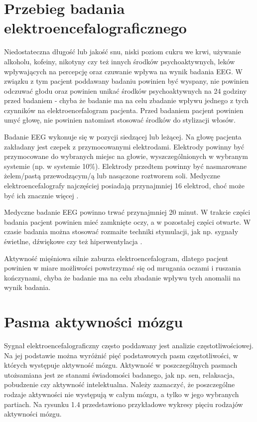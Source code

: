 \documentclass[notitlepage]{report}
\begin{document}
\section{Przebieg badania elektroencefalograficznego}
Niedostateczna długość lub jakość snu, niski poziom cukru we krwi, używanie alkoholu, kofeiny, nikotyny czy też innych środków psychoaktywnych, leków wpływających na percepcję oraz czuwanie wpływa na wynik badania EEG. W związku z tym pacjent poddawany badaniu powinien być wyspany, nie powinien odczuwać głodu oraz powinien unikać środków psychoaktywnych na 24 godziny przed badaniem - chyba że badanie ma na celu zbadanie wpływu jednego z tych czynników na elektroencefalogram pacjenta. Przed badaniem pacjent powinien umyć głowę, nie powinien natomiast stosować środków do stylizacji włosów. 

Badanie EEG wykonuje się w pozycji siedzącej lub leżącej. Na głowę pacjenta zakładany jest czepek z przymocowanymi elektrodami. Elektrody powinny być przymocowane do wybranych miejsc na głowie, wyszczególnionych w wybranym systemie (np. w systemie 10\%). Elektrody przedtem powinny być nasmarowane żelem/pastą przewodzącym/ą lub nasączone roztworem soli. Medyczne elektroencefalografy najczęściej posiadają przynajmniej 16 elektrod, choć może być ich znacznie więcej \cite{teplan} \cite{lantz}. 

Medyczne badanie EEG powinno trwać przynajmniej 20 minut. W trakcie części badania pacjent powinien mieć zamknięte oczy, a w pozostałej części otwarte. W czasie badania można stosować rozmaite techniki stymulacji, jak np. sygnały świetlne, dźwiękowe czy też hiperwentylacja \cite{sinha}. 

Aktywność mięśniowa silnie zaburza elektroencefalogram, dlatego pacjent powinien w miare możliwości powstrzymać się od mrugania oczami i ruszania kończynami, chyba że badanie ma na celu zbadanie wpływu tych anomalii na wynik badania.

\section{Pasma aktywności mózgu}
Sygnał elektroencefalograficzny często poddawany jest analizie częstotliwościowej. Na jej podstawie można wyróżnić pięć podstawowych pasm częstotliwości, w których występuje aktywność mózgu. Aktywność w poszczególnych pasmach utożsamiana jest ze stanami świadomości badanego, jak np. sen, relaksacja, pobudzenie czy aktywność intelektualna. Należy zaznaczyć, że poszczególne rodzaje aktywności nie występują w całym mózgu, a tylko w jego wybranych partiach. Na rysunku 1.4 przedstawiono przykładowe wykresy pięciu rodzajów aktywności mózgu.
\end{document}
